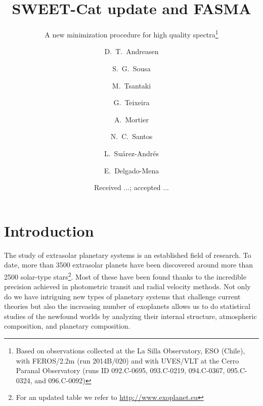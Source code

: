 \documentclass{aa}
\begin{document}
\title{SWEET-Cat update and FASMA}
\subtitle{A new minimization procedure for high quality spectra\thanks{Based on
observations collected at the La Silla Observatory, ESO (Chile), with FEROS/2.2m
(run 2014B/020) and with UVES/VLT at the Cerro Paranal Observatory (runs ID
092.C-0695, 093.C-0219, 094.C-0367, 095.C-0324, and 096.C-0092)}}


\author{ D.~T.~Andreasen
    \and S.~G.~Sousa
    \and M.~Tsantaki
    \and G.~Teixeira
    \and A.~Mortier
    \and N.~C.~Santos
    \and L.~Su\'arez-Andr\'es
    \and E.~Delgado-Mena
}







\date{Received ...; accepted ...}

\abstract
{}
{}
{}
{}
{}



\maketitle



\section{Introduction}
\label{sec:introduction}
The study of extrasolar planetary systems is an established field of research.
To date, more than 3500 extrasolar planets have been discovered around more than
2500 solar-type stars\footnote{For an updated table we refer to
\url{http://www.exoplanet.eu}}. Most of these have been found thanks to the
incredible precision achieved in photometric transit and radial velocity
methods. Not only do we have intriguing new types of planetary systems that
challenge current theories but also the increasing number of exoplanets allows
us to do statistical studies of the newfound worlds by analyzing their internal
structure, atmospheric composition, and planetary composition.
\end{document}
